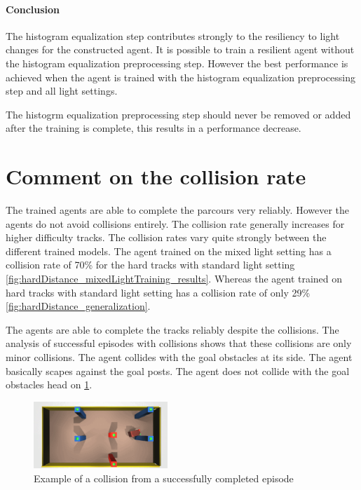 \paragraph{Conclusion}
The histogram equalization step contributes strongly to the resiliency to light changes for the constructed agent. It is possible to train a resilient agent without the histogram equalization preprocessing step.
However the best performance is achieved when the agent is trained with the histogram equalization preprocessing step and all light settings.

The histogrm equalization preprocessing step should never be removed or added after the training is complete, this results in a performance decrease.

\section{Comment on the collision rate}

The trained agents are able to complete the parcours very reliably. However the agents do not avoid collisions entirely. The collision rate generally increases for higher difficulty tracks. The collision rates vary quite strongly between the different trained models. The agent trained on the mixed light setting has a collision rate of 70\% for the hard tracks with standard light setting \ref{fig:hardDistance_mixedLightTraining_results}. Whereas the agent trained on hard tracks with standard light setting has a collision rate of only 29\% \ref{fig:hardDistance_generalization}.

The agents are able to complete the tracks reliably despite the collisions. The analysis of successful episodes with collisions shows that these collisions are only minor collisions. The agent collides with the goal obstacles at its side. The agent basically scapes against the goal posts. The agent does not collide with the goal obstacles head on \ref{fig:example_collision}. 

\begin{figure}
    \centering
    \includegraphics[width=0.45\textwidth]{Bilder/example_minor_collision_topview_frame_1295.png}
    \caption{Example of a collision from a successfully completed episode}
    \label{fig:example_collision}
\end{figure}

